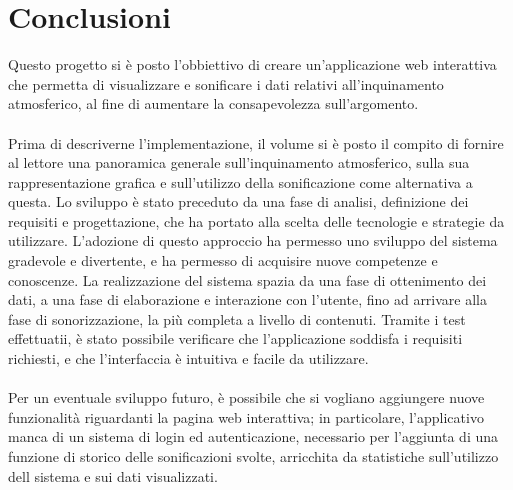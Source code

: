 \clearpage{\pagestyle{empty}\cleardoublepage}
\chapter*{Conclusioni}
Questo progetto si è posto l'obbiettivo di creare un'applicazione web interattiva che permetta di visualizzare e sonificare i dati relativi all'inquinamento atmosferico, al fine di aumentare la consapevolezza sull'argomento.
\\\\
Prima di descriverne l'implementazione, il volume si è posto il compito di fornire al lettore una panoramica generale sull'inquinamento atmosferico, sulla sua rappresentazione grafica e sull'utilizzo della sonificazione come alternativa a questa.
Lo sviluppo è stato preceduto da una fase di analisi, definizione dei requisiti e progettazione, che ha portato alla scelta delle tecnologie e strategie da utilizzare.
L'adozione di questo approccio ha permesso uno sviluppo del sistema gradevole e divertente, e ha permesso di acquisire nuove competenze e conoscenze.
La realizzazione del sistema spazia da una fase di ottenimento dei dati, a una fase di elaborazione e interazione con l'utente, fino ad arrivare alla fase di sonorizzazione, la più completa a livello di contenuti.
Tramite i test effettuatii, è stato possibile verificare che l'applicazione soddisfa i requisiti richiesti, e che l'interfaccia è intuitiva e facile da utilizzare.
\\\\
Per un eventuale sviluppo futuro, è possibile che si vogliano aggiungere nuove funzionalità riguardanti la pagina web interattiva; in particolare, l'applicativo manca di un sistema di login ed autenticazione,
necessario per l'aggiunta di una funzione di storico delle sonificazioni svolte, arricchita da statistiche sull'utilizzo dell sistema e sui dati visualizzati.

